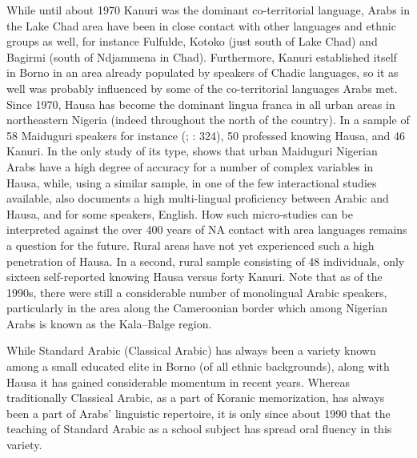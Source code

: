 \documentclass[output=paper]{langsci/langscibook}
\begin{document}
While until about 1970 Kanuri was the dominant co-territorial language, Arabs in the Lake Chad area have been in close contact with other languages and ethnic groups as well, for instance Fulfulde, Kotoko (just south of Lake Chad) and Bagirmi (south of Ndjammena in Chad). Furthermore, Kanuri established itself in Borno in an area already populated by speakers of Chadic languages, so it as well was probably influenced by some of the co-territorial languages Arabs met. Since 1970, Hausa has become the dominant lingua franca in all urban areas in northeastern Nigeria (indeed throughout the north of the country). In a sample of 58 Maiduguri speakers for instance (\citealt{Owens1998}; \citealt{Owens2000article}: 324), 50 professed knowing Hausa, and 46 Kanuri. In the only study of its type, \citet{Broß2007} shows that urban Maiduguri Nigerian Arabs have a high degree of accuracy for a number of complex variables in Hausa, while, using a similar sample, in one of the few interactional studies available, \citet{Owens2002} also documents a high multi-lingual proficiency between Arabic and Hausa, and for some speakers, English. How such micro-studies can be interpreted against the over 400 years of NA contact with area languages remains a question for the future. Rural areas have not yet experienced such a high penetration of Hausa. In a second, rural sample consisting of 48 individuals, only sixteen self-reported knowing Hausa versus forty Kanuri. Note that as of the 1990s, there were still a considerable number of monolingual Arabic speakers, particularly in the area along the Cameroonian border which among Nigerian Arabs is known as the Kala--Balge region.

While Standard Arabic (Classical Arabic) has always been a variety known among a small educated elite in Borno (of all ethnic backgrounds), along with Hausa it has gained considerable momentum in recent years. Whereas traditionally Classical Arabic, as a part of Koranic memorization, has always been a part of Arabs’ linguistic repertoire, it is only since about 1990 that the teaching of Standard Arabic as a school subject has spread oral fluency in this variety. 
\end{document}
